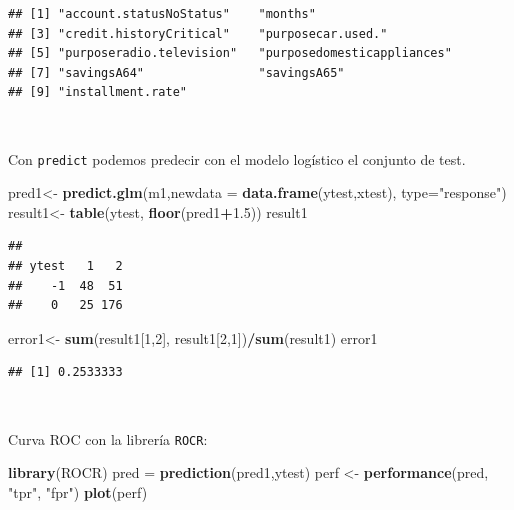 \documentclass[]{book}
\newenvironment{Shaded}{\begin{snugshade}}{\end{snugshade}}
\newcommand{\KeywordTok}[1]{\textcolor[rgb]{0.13,0.29,0.53}{\textbf{#1}}}
\newcommand{\DataTypeTok}[1]{\textcolor[rgb]{0.13,0.29,0.53}{#1}}
\newcommand{\DecValTok}[1]{\textcolor[rgb]{0.00,0.00,0.81}{#1}}
\newcommand{\FloatTok}[1]{\textcolor[rgb]{0.00,0.00,0.81}{#1}}
\newcommand{\StringTok}[1]{\textcolor[rgb]{0.31,0.60,0.02}{#1}}
\newcommand{\OperatorTok}[1]{\textcolor[rgb]{0.81,0.36,0.00}{\textbf{#1}}}
\newcommand{\NormalTok}[1]{#1}
\begin{document}
\begin{verbatim}
## [1] "account.statusNoStatus"    "months"                   
## [3] "credit.historyCritical"    "purposecar.used."         
## [5] "purposeradio.television"   "purposedomesticappliances"
## [7] "savingsA64"                "savingsA65"               
## [9] "installment.rate"
\end{verbatim}

~

Con \texttt{predict} podemos predecir con el modelo logístico el
conjunto de test.

\begin{Shaded}
\begin{Highlighting}[]
\NormalTok{pred1<-}\StringTok{ }\KeywordTok{predict.glm}\NormalTok{(m1,}\DataTypeTok{newdata =} \KeywordTok{data.frame}\NormalTok{(ytest,xtest), }\DataTypeTok{type=}\StringTok{"response"}\NormalTok{)}
\NormalTok{result1<-}\StringTok{ }\KeywordTok{table}\NormalTok{(ytest, }\KeywordTok{floor}\NormalTok{(pred1}\OperatorTok{+}\FloatTok{1.5}\NormalTok{))}
\NormalTok{result1}
\end{Highlighting}
\end{Shaded}

\begin{verbatim}
##      
## ytest   1   2
##    -1  48  51
##    0   25 176
\end{verbatim}

\begin{Shaded}
\begin{Highlighting}[]
\NormalTok{error1<-}\StringTok{ }\KeywordTok{sum}\NormalTok{(result1[}\DecValTok{1}\NormalTok{,}\DecValTok{2}\NormalTok{], result1[}\DecValTok{2}\NormalTok{,}\DecValTok{1}\NormalTok{])}\OperatorTok{/}\KeywordTok{sum}\NormalTok{(result1)}
\NormalTok{error1}
\end{Highlighting}
\end{Shaded}

\begin{verbatim}
## [1] 0.2533333
\end{verbatim}

~

Curva ROC con la librería \texttt{ROCR}:

\begin{Shaded}
\begin{Highlighting}[]
\KeywordTok{library}\NormalTok{(ROCR)}
\NormalTok{pred =}\StringTok{ }\KeywordTok{prediction}\NormalTok{(pred1,ytest)}
\NormalTok{perf <-}\StringTok{ }\KeywordTok{performance}\NormalTok{(pred, }\StringTok{"tpr"}\NormalTok{, }\StringTok{"fpr"}\NormalTok{)}
\KeywordTok{plot}\NormalTok{(perf)}
\end{Highlighting}
\end{Shaded}
\end{document}
